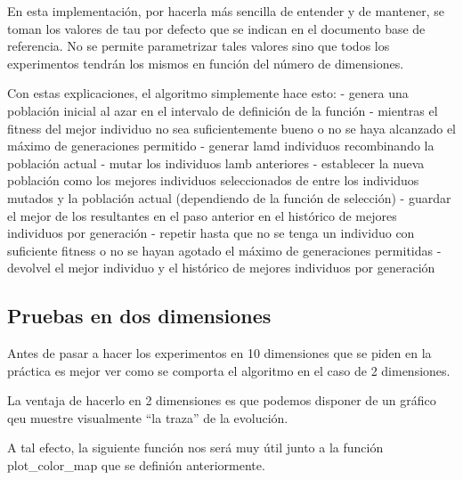 \documentclass[11pt]{article}
\begin{document}
En esta implementación, por hacerla más sencilla de entender y de
mantener, se toman los valores de tau por defecto que se indican en el
documento base de referencia. No se permite parametrizar tales valores
sino que todos los experimentos tendrán los mismos en función del número
de dimensiones.

Con estas explicaciones, el algoritmo simplemente hace esto: - genera
una población inicial al azar en el intervalo de definición de la
función - mientras el fitness del mejor individuo no sea suficientemente
bueno o no se haya alcanzado el máximo de generaciones permitido -
generar lamd individuos recombinando la población actual - mutar los
individuos lamb anteriores - establecer la nueva población como los
mejores individuos seleccionados de entre los individuos mutados y la
población actual (dependiendo de la función de selección) - guardar el
mejor de los resultantes en el paso anterior en el histórico de mejores
individuos por generación - repetir hasta que no se tenga un individuo
con suficiente fitness o no se hayan agotado el máximo de generaciones
permitidas - devolvel el mejor individuo y el histórico de mejores
individuos por generación

\subsection{Pruebas en dos
dimensiones}\label{pruebas-en-dos-dimensiones}

Antes de pasar a hacer los experimentos en 10 dimensiones que se piden
en la práctica es mejor ver como se comporta el algoritmo en el caso de
2 dimensiones.

La ventaja de hacerlo en 2 dimensiones es que podemos disponer de un
gráfico qeu muestre visualmente ``la traza'' de la evolución.

A tal efecto, la siguiente función nos será muy útil junto a la función
plot\_color\_map que se definión anteriormente.
\end{document}
